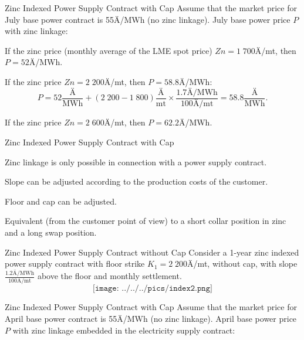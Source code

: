 {Zinc Indexed Power Supply Contract with Cap}
Assume that the market price for July base power contract is \textcolor[rgb]{1.00,0.00,0.00}{55Ä/MWh} (no zinc linkage). July base power price $P$ with zinc linkage:\\
\vspace{0.2cm}






	If the zinc price (monthly average of the LME spot price) $Zn=1\;700$Ä/mt, then \textcolor[rgb]{0.00,0.00,1.00}{$P=52$Ä/MWh}.

	If the zinc price $Zn=2\;200$Ä/mt, then \textcolor[rgb]{0.00,0.00,1.00}{$P=58.8$Ä/MWh}:
  $$P=52\frac{\text{Ä}}{\text{MWh}}+(2\;200-1\;800)\frac{\text{Ä}}{\text{mt}}\times\frac{1.7\text{Ä/MWh}}{100\text{Ä/mt}}=58.8\frac{\text{Ä}}{\text{MWh}}.$$

	If the zinc price $Zn=2\;600$Ä/mt, then \textcolor[rgb]{0.00,0.00,1.00}{$P=62.2$Ä/MWh}.






{Zinc Indexed Power Supply Contract with Cap}






	Zinc linkage is only possible in connection with a power supply contract.

	Slope can be adjusted according to the production costs of the customer.

	Floor and cap can be adjusted.

	Equivalent (from the customer point of view) to a short collar position in zinc and a long swap position.






{Zinc Indexed Power Supply Contract without Cap}
Consider a 1-year zinc indexed power supply contract with floor strike $K_1=2\;200$Ä/mt, without cap, with slope $\frac{1.2\text{Ä/MWh}}{100\text{Ä/mt}}$ above the floor and monthly settlement.
$$\texttt{[image: ../../../pics/index2.png]}$$

{Zinc Indexed Power Supply Contract with Cap}
Assume that the market price for April base power contract is \textcolor[rgb]{1.00,0.00,0.00}{55Ä/MWh} (no zinc linkage). April base power price $P$ with zinc linkage embedded in the electricity supply contract:
\vspace{0.4cm}



